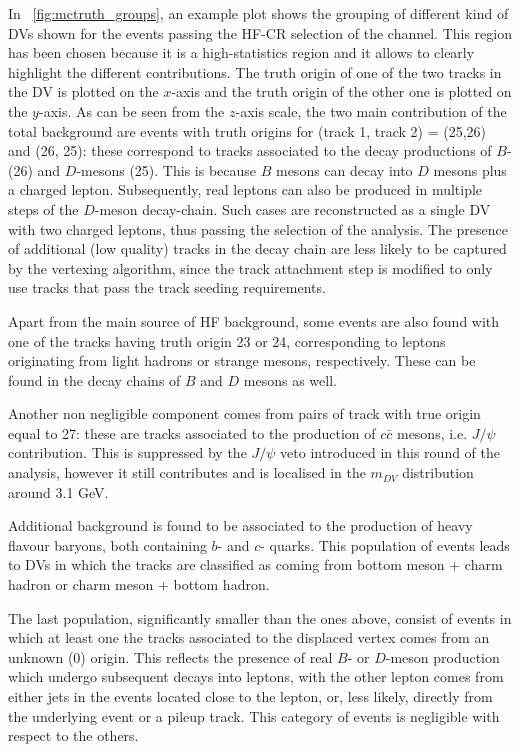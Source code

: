 In ~\cref{fig:mctruth_groups}, an example plot shows the grouping of different kind of DVs shown for the events passing the HF-CR selection of the \uuu channel. This region has been chosen because it is a high-statistics region and it allows to clearly highlight the different contributions. The truth origin of one of the two tracks in the DV is plotted on the $x$-axis and the truth origin of the other one is plotted on the $y$-axis. As can be seen from the $z$-axis scale, the two main contribution of the total background are events with truth origins for (track 1, track 2) = (25,26) and (26, 25): these correspond to tracks associated to the decay productions of $B$- (26) and $D$-mesons (25). This is because $B$ mesons can decay into $D$ mesons plus a charged lepton. Subsequently, real leptons can also be produced in multiple steps of the $D$-meson decay-chain. Such cases are reconstructed as a single DV with two charged leptons, thus passing the selection of the analysis. The presence of additional (low quality) tracks in the decay chain are less likely to be captured by the vertexing algorithm, since the track attachment step is modified to only use tracks that pass the track seeding requirements.

Apart from the main source of HF background, some events are also found with one of the tracks having truth origin 23 or 24, corresponding to leptons originating from light hadrons or strange mesons, respectively. These can be found in the decay chains of $B$ and $D$ mesons as well. 

Another non negligible component comes from pairs of track with true origin equal to 27: these are tracks associated to the production of $c\bar{c}$ mesons, i.e. $J/\psi$ contribution. This is suppressed by the $J/\psi$ veto introduced in this round of the analysis, however it still contributes and is localised in the $m_{DV}$ distribution around 3.1 GeV.

Additional background is found to be associated to the production of heavy flavour baryons, both containing $b$- and $c$- quarks. This population of events leads to DVs in which the tracks are classified as coming from bottom meson + charm hadron or charm meson + bottom hadron. 

The last population, significantly smaller than the ones above, consist of events in which at least one the tracks associated to the displaced vertex comes from an unknown (0) origin. This reflects the presence of real $B$- or $D$-meson production which undergo subsequent decays into leptons, with the other lepton comes from either jets in the events located close to the lepton, or, less likely, directly from the underlying event or a pileup track. This category of events is negligible with respect to the others.

